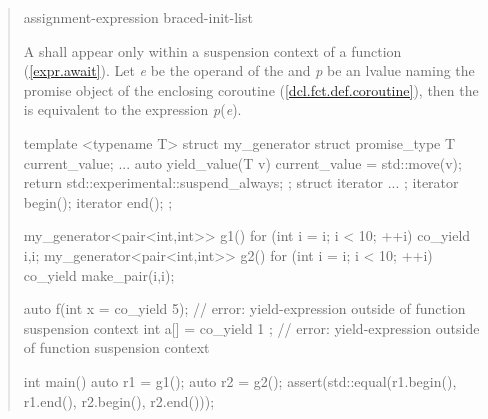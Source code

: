 \begin{quote}
\begin{bnf}
  \br
   assignment-expression\br
   braced-init-list
\end{bnf}

\pnum
A  shall appear only within a suspension context of a function (\ref{expr.await}).
  Let \textit{e} be the operand of the  and \textit{p} be an lvalue naming the promise object of the enclosing coroutine (\ref{dcl.fct.def.coroutine}), then the  is equivalent to the expression  \textit{p}(\textit{e}). 
  

\enterexample
\begin{codeblock}
template <typename T>
struct my_generator {
  struct promise_type {
    T current_value;
    ...
    auto yield_value(T v) {
      current_value = std::move(v);
      return std::experimental::suspend_always{};
    }
  };
  struct iterator { ... };
  iterator begin();
  iterator end();
};
  
my_generator<pair<int,int>> g1() {
  for (int i = i; i < 10; ++i) co_yield {i,i};
}
my_generator<pair<int,int>> g2() { 
  for (int i = i; i < 10; ++i) co_yield make_pair(i,i);
}

auto f(int x = co_yield 5); // error: yield-expression outside of function suspension context
int a[] = { co_yield 1 }; // error: yield-expression outside of function suspension context

int main() {
  auto r1 = g1();
  auto r2 = g2();
  assert(std::equal(r1.begin(), r1.end(), r2.begin(), r2.end()));
}
\end{codeblock}

\exitexample
%
%



\end{quote}


